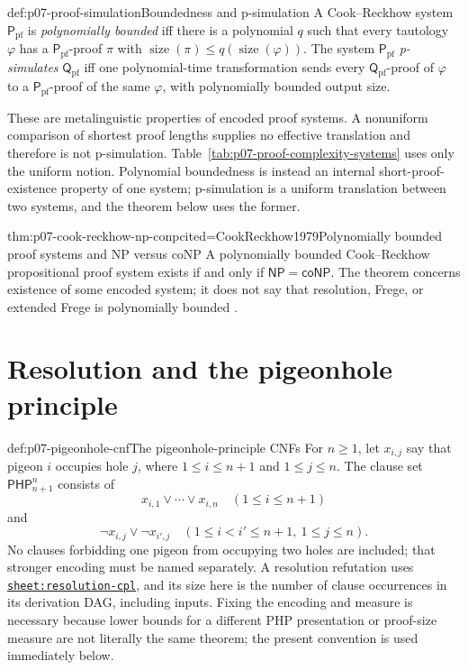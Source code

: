 \begin{hbdefinition}{def:p07-proof-simulation}{Boundedness and p-simulation}
A Cook--Reckhow system \(\mathsf P_{\mathrm{pf}}\) is \emph{polynomially bounded} iff
there is a polynomial \(q\) such that every tautology \(\varphi\) has a
\(\mathsf P_{\mathrm{pf}}\)-proof \(\pi\) with
\(\operatorname{size}(\pi)\leq q(\operatorname{size}(\varphi))\).
The system \(\mathsf P_{\mathrm{pf}}\) \emph{p-simulates}
\(\mathsf Q_{\mathrm{pf}}\) iff one polynomial-time transformation sends every
\(\mathsf Q_{\mathrm{pf}}\)-proof of \(\varphi\) to a
\(\mathsf P_{\mathrm{pf}}\)-proof of the same \(\varphi\), with
polynomially bounded output size.

These are metalinguistic properties of encoded proof systems.  A nonuniform
comparison of shortest proof lengths supplies no effective translation and
therefore is not p-simulation.  Table~\ref{tab:p07-proof-complexity-systems}
uses only the uniform notion.  Polynomial boundedness is instead an internal
short-proof-existence property of one system; p-simulation is a uniform
translation between two systems, and the theorem below uses the former.
\end{hbdefinition}

\begin{hbtheorem}{thm:p07-cook-reckhow-np-conp}{cited=CookReckhow1979}{Polynomially bounded proof systems and NP versus coNP}
A polynomially bounded Cook--Reckhow propositional proof system exists if and
only if \(\mathsf{NP}=\mathsf{coNP}\).  The theorem concerns existence of
some encoded system; it does not say that resolution, Frege, or extended
Frege is polynomially bounded \cite{CookReckhow1979,Krajicek2019}.
\end{hbtheorem}

\section{Resolution and the pigeonhole principle}
\label{sec:p07-resolution-lower-bound}

\begin{hbdefinition}{def:p07-pigeonhole-cnf}{The pigeonhole-principle CNFs}
For \(n\geq1\), let \(x_{i,j}\) say that pigeon \(i\) occupies hole \(j\),
where \(1\leq i\leq n+1\) and \(1\leq j\leq n\).  The clause set
\(\mathsf{PHP}^{n}_{n+1}\) consists of
\[
  x_{i,1}\lor\cdots\lor x_{i,n}
  \quad(1\leq i\leq n+1)
\]
and
\[
  \neg x_{i,j}\lor\neg x_{i',j}
  \quad(1\leq i<i'\leq n+1,\ 1\leq j\leq n).
\]
No clauses forbidding one pigeon from occupying two holes are included; that
stronger encoding must be named separately.  A resolution refutation uses
\hyperref[sheet:resolution-cpl]{\texttt{sheet:resolution-cpl}}, and its size
here is the number of clause occurrences in its derivation DAG, including
inputs.  Fixing the encoding and measure is necessary because lower bounds
for a different PHP presentation or proof-size measure are not literally the
same theorem; the present convention is used immediately below.
\end{hbdefinition}

